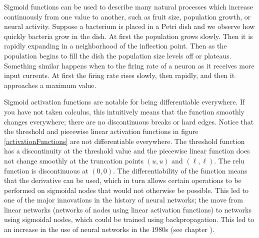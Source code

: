   Sigmoid  functions can be used to describe many natural processes which increase continuously from one value to another, such as fruit size, population growth, or  neural activity. Suppose a bacterium is placed in a Petri dish and we observe how quickly bacteria grow in the dish. At first the population grows slowly. Then it is rapidly expanding in a neighborhood of the inflection point. Then as the population begins to fill the dish the population size levels off or plateaus. Something similar happens when to the firing rate of a neuron as it receives more input currents. At first the firing rate rises slowly, then rapidly, and then it approaches a maximum value.

Sigmoid activation functions are notable for being differentiable everywhere. If you have not taken calculus, this intuitively means that the function smoothly changes everywhere; there are no discontinuous breaks or hard edges. Notice that the threshold and piecewise linear activation functions in figure \ref{activationFunctions} are not differentiable everywhere. The threshold function has a discontinuity at the threshold value and the piecewise linear function does not change smoothly at the truncation points $(u,u)$ and $(\ell,\ell)$. The relu function is discontinuous at $(0,0)$. The differentiability of the function means that the derivative can be used, which in turn allows certain operations to be performed on sigmoidal nodes that would not otherwise be possible. This led to one of the major innovations in the history of neural networks; the move from linear networks (networks of nodes using linear activation functions) to networks using sigmoidal nodes, which could be trained using backpropagation. This led to an increase in the use of neural networks in the 1980s (see chapter ). 

